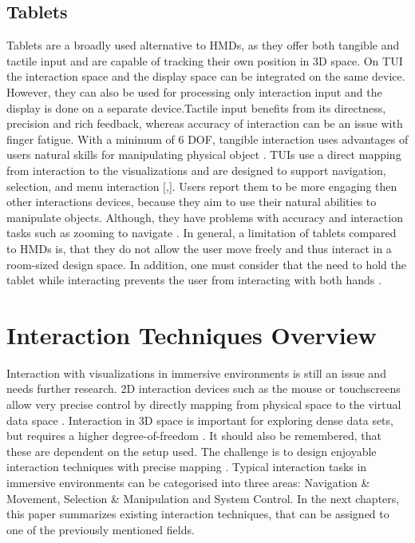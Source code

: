 \subsection{Tablets}
Tablets are a broadly used alternative to \ac{HMD}s, as they offer both tangible and tactile input and are capable of tracking their own position in 3D space. On \ac{TUI} the interaction space and the display space can be integrated on the same device. However, they can also be used for processing only interaction input and the display is done on a separate device.\newline Tactile input benefits from its directness, precision and rich feedback, whereas accuracy of interaction can be an issue with finger fatigue. With a minimum of 6 \ac{DOF}, tangible interaction uses advantages of users natural skills for manipulating physical object \autocite[881-882]{Besancon2017}. \newline
\ac{TUI}s use a direct mapping from interaction to the visualizations and are designed to support navigation, selection, and menu interaction [\autocite[47]{Cordeil2017},\autocite[4]{Butscher2018}]. Users report them to be more engaging then other interactions devices, because they aim to use their natural abilities to manipulate objects. Although, they have problems with accuracy and interaction tasks such as zooming to navigate \autocite[882]{Besancon2017}. \newline
In general, a limitation of tablets compared to \ac{HMD}s is, that they do not allow the user move freely and thus interact in a room-sized design space. In addition, one must consider that the need to hold the tablet while interacting prevents the user from interacting with both hands \autocite[883]{Besancon2017}.

\section{Interaction Techniques Overview}
\label{section:Interaction Techniques 3D}
Interaction with visualizations in immersive environments is still an issue and needs further research. 2D interaction devices such as the mouse or touchscreens allow very precise control by directly mapping from physical space to the virtual data space \autocite[1]{Cordeil2017}. Interaction in 3D space is important for exploring dense data sets, but requires a higher degree-of-freedom \autocite[]{Bach2018}. It should also be remembered, that these are dependent on the setup used. The challenge is to design enjoyable interaction techniques with precise mapping \autocite[]{Jankowski2013}. Typical interaction tasks in immersive environments can be categorised into three areas: Navigation \& Movement, Selection \& Manipulation and System Control. In the next chapters, this paper summarizes existing interaction techniques, that can be assigned to one of the previously mentioned fields.

